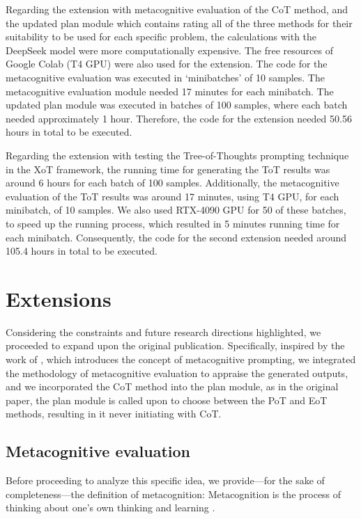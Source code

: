 \documentclass[10pt]{article} %
\begin{document}
Regarding the extension with metacognitive evaluation of the CoT method, and the updated plan module which contains rating all of the three methods for their suitability to be used for each specific problem, the calculations with the DeepSeek model were more computationally expensive. The free resources of Google Colab (T4 GPU) were also used for the extension. The code for the metacognitive evaluation was executed in `minibatches' of 10 samples. The metacognitive evaluation module needed 17 minutes for each minibatch. The updated plan module was executed in batches of 100 samples, where each batch needed approximately 1 hour. Therefore, the code for the extension needed 50.56 hours in total to be executed.

Regarding the extension with testing the Tree-of-Thoughts prompting technique in the XoT framework, the running time for generating the ToT results was around 6 hours for each batch of 100 samples. Additionally, the metacognitive evaluation of the ToT results was around 17 minutes, using T4 GPU, for each minibatch, of 10 samples. We also used RTX-4090 GPU for 50 of these batches, to speed up the running process, which resulted in 5 minutes running time for each minibatch. Consequently, the code for the second extension needed around 105.4 hours in total to be executed.

\section{Extensions}
Considering the constraints and future research directions highlighted, we proceeded to expand upon the original publication. Specifically, inspired by the work of \citet{wang2023metacognitive}, which introduces the concept of metacognitive prompting, we integrated the methodology of metacognitive evaluation to appraise the generated outputs, and we incorporated the CoT method into the plan module, as in the original paper, the plan module is called upon to choose between the PoT and EoT methods, resulting in it never initiating with CoT.

\subsection{Metacognitive evaluation}
Before proceeding to analyze this specific idea, we provide—for the sake of completeness—the definition of metacognition: Metacognition is the process of thinking about one's own thinking and learning \citep{queensu_metacognition}.
\end{document}
